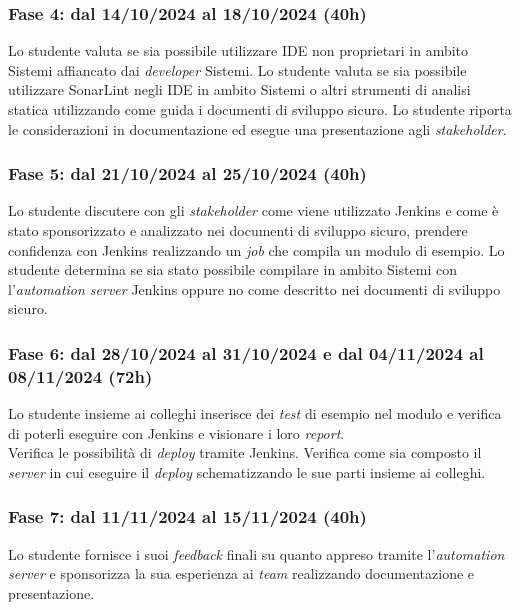 \subsubsection*{Fase 4: dal 14/10/2024 al 18/10/2024 (40h) }
Lo studente valuta se sia possibile utilizzare \gls{IDE} non proprietari in ambito \gls{Sistemi} affiancato dai \emph{developer} \gls{Sistemi}. Lo studente valuta se sia possibile utilizzare SonarLint negli \gls{IDE} in ambito \gls{Sistemi} o altri strumenti di analisi statica utilizzando come guida i documenti di sviluppo sicuro. Lo studente riporta le considerazioni in documentazione ed esegue una presentazione agli \emph{stakeholder}.\\ 

\subsubsection*{Fase 5: dal 21/10/2024 al 25/10/2024 (40h) }
Lo studente discutere con gli \emph{stakeholder} come viene utilizzato Jenkins e come è stato sponsorizzato e analizzato nei documenti di sviluppo sicuro, prendere confidenza con Jenkins realizzando un \emph{job} che compila un modulo di esempio. Lo studente determina se sia stato possibile compilare in ambito \gls{Sistemi} con l'\emph{automation server} Jenkins oppure no come descritto nei documenti di sviluppo sicuro.\\

\subsubsection*{Fase 6: dal 28/10/2024 al 31/10/2024 e dal 04/11/2024 al 08/11/2024 (72h)}
Lo studente insieme ai colleghi inserisce dei \emph{test} di esempio nel modulo e verifica di poterli eseguire con Jenkins e visionare i loro \emph{report}.\\
Verifica le possibilità di \emph{deploy} tramite Jenkins. Verifica come sia composto il \emph{server} in cui eseguire il \emph{deploy} schematizzando le sue parti insieme ai colleghi.\\

\subsubsection*{Fase 7: dal 11/11/2024 al 15/11/2024 (40h) }
Lo studente fornisce i suoi \emph{feedback} finali su quanto appreso tramite l'\emph{automation server} e sponsorizza la sua esperienza ai \emph{team} realizzando documentazione e presentazione.\\

